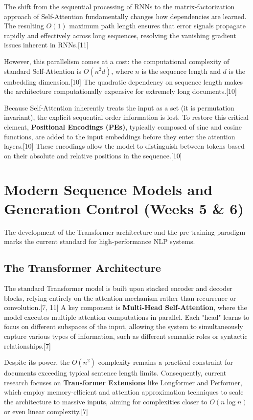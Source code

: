 \documentclass{article}
\begin{document}
The shift from the sequential processing of RNNs to the matrix-factorization approach of Self-Attention fundamentally changes how dependencies are learned. The resulting $O(1)$ maximum path length ensures that error signals propagate rapidly and effectively across long sequences, resolving the vanishing gradient issues inherent in RNNs.[11]

However, this parallelism comes at a cost: the computational complexity of standard Self-Attention is $O(n^2d)$, where $n$ is the sequence length and $d$ is the embedding dimension.[10] The quadratic dependency on sequence length makes the architecture computationally expensive for extremely long documents.[10]

Because Self-Attention inherently treats the input as a set (it is permutation invariant), the explicit sequential order information is lost. To restore this critical element, \textbf{Positional Encodings (PEs)}, typically composed of sine and cosine functions, are added to the input embeddings before they enter the attention layers.[10] These encodings allow the model to distinguish between tokens based on their absolute and relative positions in the sequence.[10]

\section{Modern Sequence Models and Generation Control (Weeks 5 \& 6)}

The development of the Transformer architecture and the pre-training paradigm marks the current standard for high-performance NLP systems.

\subsection{The Transformer Architecture}

The standard Transformer model is built upon stacked encoder and decoder blocks, relying entirely on the attention mechanism rather than recurrence or convolution.[7, 11] A key component is \textbf{Multi-Head Self-Attention}, where the model executes multiple attention computations in parallel. Each "head" learns to focus on different subspaces of the input, allowing the system to simultaneously capture various types of information, such as different semantic roles or syntactic relationships.[7]

Despite its power, the $O(n^2)$ complexity remains a practical constraint for documents exceeding typical sentence length limits. Consequently, current research focuses on \textbf{Transformer Extensions} like Longformer and Performer, which employ memory-efficient and attention approximation techniques to scale the architecture to massive inputs, aiming for complexities closer to $O(n \log n)$ or even linear complexity.[7]
\end{document}
